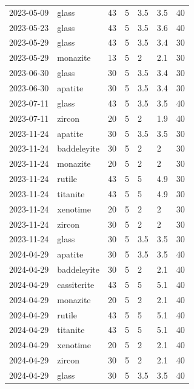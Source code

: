 \begin{longtable}{p{} p{} p{} p{} p{} p{} p{}}
  2023-05-09 & glass & 43 & 5 & 3.5 & 3.5  & 40 \\
  2023-05-23 & glass & 43 & 5 & 3.5 & 3.6  & 40 \\
  2023-05-29 & glass & 43 & 5 & 3.5 & 3.4  & 30 \\
  2023-05-29 & monazite & 13 & 5 & 2 & 2.1  & 30 \\
  2023-06-30 & glass & 30 & 5 & 3.5 & 3.4  & 30 \\
  2023-06-30 & apatite & 30 & 5 & 3.5 & 3.4  & 30 \\
  2023-07-11 & glass & 43 & 5 & 3.5 & 3.5  & 40 \\
  2023-07-11 & zircon & 20 & 5 & 2 & 1.9  & 40 \\
  2023-11-24 & apatite & 30 & 5 & 3.5 & 3.5  & 30 \\
  2023-11-24 & baddeleyite & 30 & 5 & 2 & 2  & 30 \\
  2023-11-24 & monazite & 20 & 5 & 2 & 2  & 30 \\
  2023-11-24 & rutile & 43 & 5 & 5 & 4.9  & 30 \\
  2023-11-24 & titanite & 43 & 5 & 5 & 4.9  & 30 \\
  2023-11-24 & xenotime & 20 & 5 & 2 & 2  & 30 \\
  2023-11-24 & zircon & 30 & 5 & 2 & 2  & 30 \\
  2023-11-24 & glass & 30 & 5 & 3.5&  3.5  & 30 \\
  2024-04-29 & apatite & 30 & 5 & 3.5 & 3.5  & 40 \\
  2024-04-29 & baddeleyite & 30 & 5 & 2 & 2.1  & 40 \\
  2024-04-29 & cassiterite & 43 & 5 & 5 & 5.1  & 40 \\
  2024-04-29 & monazite & 20 & 5 & 2 & 2.1  & 40 \\
  2024-04-29 & rutile & 43 & 5 & 5 & 5.1  & 40 \\
  2024-04-29 & titanite & 43 & 5 & 5 & 5.1  & 40 \\
  2024-04-29 & xenotime & 20 & 5 & 2 & 2.1  & 40 \\
  2024-04-29 & zircon & 30 & 5 & 2 & 2.1  & 40 \\
  2024-04-29 & glass & 30 & 5 & 3.5 & 3.5  & 40 \\
\end{longtable}